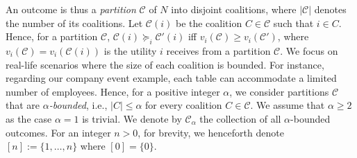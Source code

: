 \documentclass[letterpaper]{article} %
\DeclareMathOperator*{\argmax}{arg\,max}
\begin{document}
An outcome is thus a \textit{partition} $\mathcal{C}$ of $N$ into disjoint coalitions, where $|\mathcal{C}|$ denotes the number of its coalitions. Let $\mathcal{C}(i)$ be the coalition $C \in \mathcal{C}$ such that $i \in C$. Hence, for a partition $\mathcal{C}$, $\mathcal{C}(i) \succeq_i \mathcal{C}'(i)$ iff $v_i(\mathcal{C}) \geq v_i(\mathcal{C}')$, where $v_i(\mathcal{C}) = v_i(\mathcal{C}(i))$ is the utility $i$ receives from a partition $\mathcal{C}$. We focus on real-life scenarios where the size of each coalition is bounded. For instance, regarding our company event example, each table can accommodate a limited number of employees. Hence, for a positive integer $\alpha$, we consider partitions $\mathcal{C}$ that are \textit{$\alpha$-bounded}, i.e., $|C| \leq \alpha$ for every coalition $C \in \mathcal{C}$. We assume that $\alpha \geq 2$ as the case $\alpha=1$ is trivial. We denote by $\mathscr{C}_{\alpha}$ the collection of all $\alpha$-bounded outcomes. For an integer $n > 0$, for brevity, we henceforth denote $[n] := \{1,\dots,n\}$ where $[0] = \{0\}$.
%

%
%

%
\end{document}

